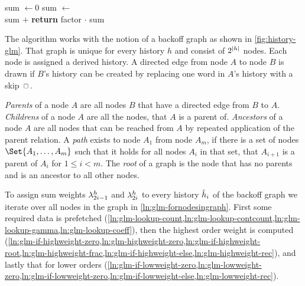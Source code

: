 \begin{algorithm}[t]
\begin{algorithmic}[1]
      \vspace{0.7em}
      \State sum $\gets 0$
        \label{ln:lowhlp-init-sum}
        \label{ln:lowhlp-for}
          \label{ln:lowhlp-isancestor}
          \State sum $\gets$
            \label{ln:lowhlp-add-1}\\
            \hfill sum $+$ 
            \label{ln:lowhlp-add-2}
        \EndIf{}
      \EndFor
      \State \textbf{return} factor $\cdot$ sum
        \label{ln:lowhlp-return}
    \EndFunction
  \end{algorithmic}
\end{algorithm}

The algorithm works with the notion of a backoff graph as shown in
\cref{fig:history-glm}.
That graph is unique for every history $h$ and consist of $2^{\left|h\right|}$
nodes.
Each node is assigned a derived history.
A directed edge from node $A$ to node $B$ is drawn if $B$'s history can be
created by replacing one word in $A$'s history with a skip $\Skp$.

\emph{Parents} of a node $A$ are all nodes $B$ that have a directed edge from
$B$ to $A$.
\emph{Childrens} of a node $A$ are all the nodes, that $A$ is a parent of.
\emph{Ancestors} of a node $A$ are all nodes that can be reached from $A$
by repeated application of the parent relation.
A \emph{path} exists to node $A_1$ from node $A_m$, if there is a set of nodes
$\Set{A_1, \ldots, A_m}$ such that it holds for all nodes $A_i$ in that set,
that $A_{i+1}$ is a parent of $A_i$ for $1 \leq i < m$.
The \emph{root} of a graph is the node that has no parents and is an ancestor
to all other nodes.

To assign sum weights $\lambda^h_{2 i - 1}$ and $\lambda^h_{2 i}$ to
every history $\DerivedHistory[i]$ of the backoff graph we iterate over all
nodes in the graph in \cref{ln:glm-fornodesingraph}.
First some required data is prefetched
(\cref{ln:glm-lookup-count,ln:glm-lookup-contcount,ln:glm-lookup-gamma,ln:glm-lookup-coeff}),
then the highest order weight is computed
(\cref{ln:glm-if-highweight-zero,ln:glm-highweight-zero,ln:glm-if-highweight-root,ln:glm-highweight-frac,ln:glm-if-highweight-else,ln:glm-highweight-rec}),
and lastly that for lower orders
(\cref{ln:glm-if-lowweight-zero,ln:glm-lowweight-zero,ln:glm-if-lowweight-zero,ln:glm-if-lowweight-else,ln:glm-lowweight-rec}).

